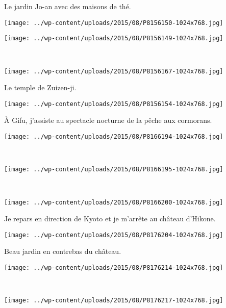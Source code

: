  Le jardin Jo-an avec des maisons de thé.
\begin{center} \texttt{[image: ../wp-content/uploads/2015/08/P8156150-1024x768.jpg]} \end{center}
\begin{center} \texttt{[image: ../wp-content/uploads/2015/08/P8156149-1024x768.jpg]} \end{center}
\vspace{-\topsep}
\vspace{-3.25mm}
\pagebreak
~
\begin{center} \texttt{[image: ../wp-content/uploads/2015/08/P8156167-1024x768.jpg]} \end{center}

 Le temple de Zuizen-ji.
\begin{center} \texttt{[image: ../wp-content/uploads/2015/08/P8156154-1024x768.jpg]} \end{center}
\vspace{-\topsep}
\pagebreak

  \`A Gifu, j'assiste au spectacle nocturne de la pêche aux cormorans. 
\begin{center} \texttt{[image: ../wp-content/uploads/2015/08/P8166194-1024x768.jpg]} \end{center}
~
\begin{center} \texttt{[image: ../wp-content/uploads/2015/08/P8166195-1024x768.jpg]} \end{center}
\vspace{-\topsep}
\pagebreak
~
\begin{center} \texttt{[image: ../wp-content/uploads/2015/08/P8166200-1024x768.jpg]} \end{center}

 Je repars en direction de Kyoto et je m'arrête au château d'Hikone.
\begin{center} \texttt{[image: ../wp-content/uploads/2015/08/P8176204-1024x768.jpg]} \end{center}
\vspace{-\topsep}
\pagebreak

  Beau jardin en contrebas du château.
\begin{center} \texttt{[image: ../wp-content/uploads/2015/08/P8176214-1024x768.jpg]} \end{center}
~
\begin{center} \texttt{[image: ../wp-content/uploads/2015/08/P8176217-1024x768.jpg]} \end{center}
\vspace{-\topsep}
\pagebreak
 
